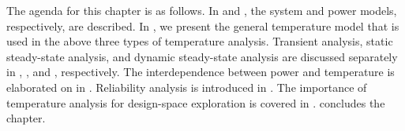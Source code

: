 The agenda for this chapter is as follows. In  and
, the system and power models, respectively, are described. In
, we present the general temperature model that is used
in the above three types of temperature analysis. Transient analysis, static
steady-state analysis, and dynamic steady-state analysis are discussed
separately in , ,
and , respectively. The interdependence
between power and temperature is elaborated on in
. Reliability analysis is introduced in
. The importance of temperature analysis for
design-space exploration is covered in .
 concludes the chapter.
